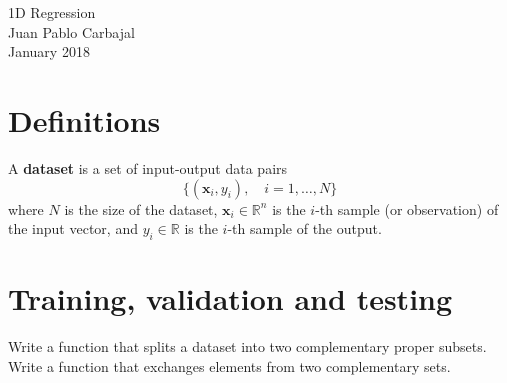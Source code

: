 \documentclass[10pt,english,final,a4paper]{exam}
\begin{document}
\begin{center}
{\Large 1D Regression}\\
Juan Pablo Carbajal\\
January 2018
\end{center}

\vspace{1.5em}


\section{Definitions}
A \textbf{dataset} is a set of input-output data pairs 
\begin{equation}
\lbrace \left(\bm{x}_i, y_i\right), \quad i = 1, \ldots, N\rbrace
\end{equation}
\noindent where $N$ is the size of the dataset, $\bm{x}_i \in \mathbb{R}^n$ is the $i$-th sample (or observation) of the input vector, and $y_i \in \mathbb{R}$
is the $i$-th sample of the output.

\section{Training, validation and testing}
\begin{questions}
Write a function that splits a dataset into two complementary proper subsets.
Write a function that exchanges elements from two complementary sets.
\end{questions}
\end{document}

